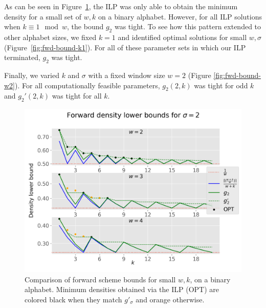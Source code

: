 \documentclass{article}
\begin{document}
As can be seen in Figure~\ref{fig:fwd-bound-sigma2}, the ILP was only able to obtain the minimum density for a small set of $w,k$ on a binary alphabet. However, for all ILP solutions when $k\equiv 1\mod w$, the bound $g_2$ was tight. To see how this pattern extended to other alphabet sizes, we fixed $k=1$ and identified optimal solutions for small $w,\sigma$ (Figure~\ref{fig:fwd-bound-k1}). For all of these parameter sets in which our ILP terminated, $g_2$ was tight. 

Finally, we varied $k$ and $\sigma$ with a fixed window size $w=2$ (Figure \ref{fig:fwd-bound-w2}). For all computationally feasible parameters, $g_{2}(2, k)$ was tight for odd $k$ and $g_{2}'(2, k)$  was tight for all $k$. 

\begin{figure}[ht]
\includegraphics[width=\textwidth]{media/bound-fwd-sigma2.png}
\caption{Comparison of forward scheme bounds for small $w,k$, on a binary alphabet. Minimum densities obtained via the ILP (OPT) are colored black when they match $g'_\sigma$ and orange otherwise.}
\label{fig:fwd-bound-sigma2}
\end{figure}
\end{document}
